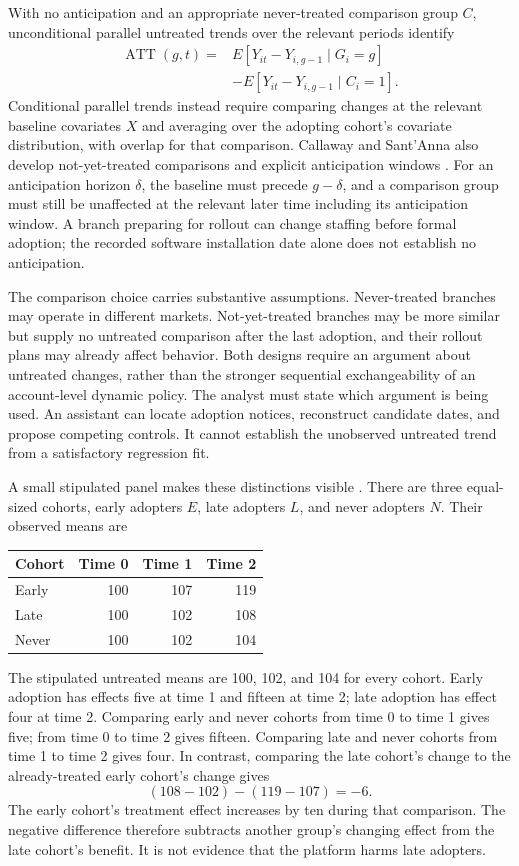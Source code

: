 With no anticipation and an appropriate never-treated comparison group $C$,
unconditional parallel untreated trends over the relevant periods identify
\begin{align*}
 \operatorname{ATT}(g,t)
 ={}&E[Y_{it}-Y_{i,g-1}\mid G_i=g]\\
 &-E[Y_{it}-Y_{i,g-1}\mid C_i=1].
\end{align*}
Conditional parallel trends instead require comparing changes at the relevant
baseline covariates $X$ and averaging over the adopting cohort's covariate
distribution, with overlap for that comparison. Callaway and Sant'Anna also
develop not-yet-treated comparisons and explicit anticipation windows
\cite{callaway2021}. For an anticipation horizon $\delta$, the baseline must
precede $g-\delta$, and a comparison group must still be unaffected at the
relevant later time including its anticipation window. A branch preparing for
rollout can change staffing before formal adoption; the recorded software
installation date alone does not establish no anticipation.

The comparison choice carries substantive assumptions. Never-treated branches
may operate in different markets. Not-yet-treated branches may be more similar
but supply no untreated comparison after the last adoption, and their rollout
plans may already affect behavior. Both designs require an argument about
untreated changes, rather than the stronger sequential exchangeability of an
account-level dynamic policy. The analyst must state which argument is being
used. An assistant can locate adoption notices, reconstruct candidate dates,
and propose competing controls. It cannot establish the unobserved untreated
trend from a satisfactory regression fit.

A small stipulated panel makes these distinctions visible
\cite{exec14_workflow_oracle}. There are three equal-sized cohorts, early
adopters $E$, late adopters $L$, and never adopters $N$. Their observed means are
\begin{center}
\begin{tabular}{lrrr}
\toprule
Cohort & Time 0 & Time 1 & Time 2\\
\midrule
Early &100&107&119\\
Late &100&102&108\\
Never &100&102&104\\
\bottomrule
\end{tabular}
\end{center}
The stipulated untreated means are 100, 102, and 104 for every cohort.
Early adoption has effects five at time 1 and fifteen at time 2; late adoption
has effect four at time 2. Comparing early and never cohorts from time 0 to
time 1 gives five; from time 0 to time 2 gives fifteen. Comparing late and
never cohorts from time 1 to time 2 gives four. In contrast, comparing the
late cohort's change to the already-treated early cohort's change gives
\[
 (108-102)-(119-107)=-6.
\]
The early cohort's treatment effect increases by ten during that comparison.
The negative difference therefore subtracts another group's changing effect
from the late cohort's benefit. It is not evidence that the platform harms
late adopters.

